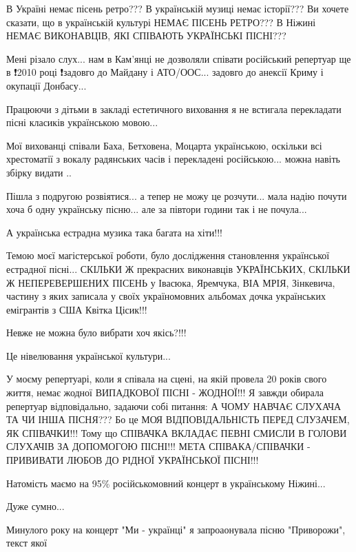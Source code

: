 В Україні немає пісень ретро??? В українській музиці немає історії??? Ви хочете
сказати, що в українській культурі НЕМАЄ ПІСЕНЬ РЕТРО??? В Ніжині НЕМАЄ
ВИКОНАВЦІВ, ЯКІ СПІВАЮТЬ УКРАЇНСЬКІ ПІСНІ???

Мені різало слух... нам в Кам'янці не дозволяли співати російський репертуар ще
в ❗2010 році ❗задовго до Майдану і АТО/ООС... задовго до анексії Криму і
окупації Донбасу...

Працюючи з дітьми в закладі естетичного виховання я не встигала перекладати пісні класиків українською мовою...

Мої вихованці співали Баха, Бетховена, Моцарта українською, оскільки всі
хрестоматії з вокалу радянських часів і перекладені російською... можна навіть
збірку видати ..

Пішла з подругою розвіятися... а тепер не можу це розчути... мала надію почути
хоча б одну українську пісню... але за півтори години так і не почула... 

А українська естрадна музика така багата на хіти!!!

Темою моєї магістерської роботи, було дослідження становлення української
естрадної пісні... СКІЛЬКИ Ж прекрасних виконавців УКРАЇНСЬКИХ, СКІЛЬКИ Ж
НЕПЕРЕВЕРШЕНИХ ПІСЕНЬ у Івасюка, Яремчука, ВІА МРІЯ, Зінкевича, частину з яких
записала у своїх україномовних альбомах дочка українських емігрантів з США
Квітка Цісик!!! 

Невже не можна було вибрати хоч якісь?!!!

Це нівелювання української культури... 

У моєму репертуарі, коли я співала на сцені, на якій провела 20 років свого
життя, немає жодної ВИПАДКОВОЇ ПІСНІ - ЖОДНОЇ!!! Я завжди обирала репертуар
відповідально, задаючи собі питання: А ЧОМУ НАВЧАЄ СЛУХАЧА ТА ЧИ ІНША ПІСНЯ???
Бо це МОЯ ВІДПОВІДАЛЬНІСТЬ ПЕРЕД СЛУЗАЧЕМ, ЯК СПІВАЧКИ!!! Тому що СПІВАЧКА
ВКЛАДАЄ ПЕВНІ СМИСЛИ В ГОЛОВИ СЛУХАЧІВ ЗА ДОПОМОГОЮ ПІСНІ!!! МЕТА
СПІВАКА/СПІВАЧКИ - ПРИВИВАТИ ЛЮБОВ ДО РІДНОЇ УКРАЇНСЬКОЇ ПІСНІ!!!

Натомість маємо на 95\% російськомовний концерт в українському Ніжині... 

Дуже сумно... 

Минулого року на концерт "Ми - українці" я запроаонувала пісню "Приворожи", текст якої 

